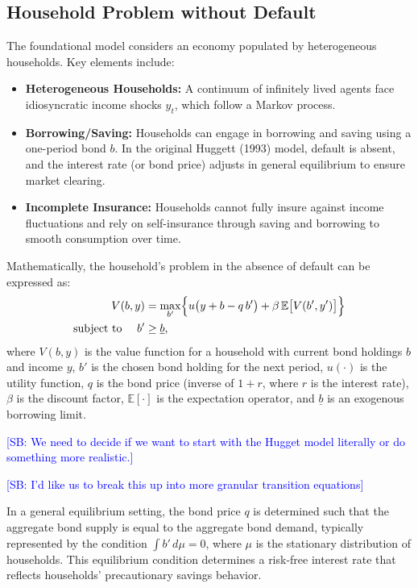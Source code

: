 \documentclass[acmsmall]{acmart}
\newcommand{\spb}[1]{\textcolor{blue}{[SB: #1]}}
\begin{document}
\subsection{Household Problem without Default}


The foundational \citep{Huggett1993} model considers an economy populated by heterogeneous households. Key elements include:

\begin{itemize}
    \item \textbf{Heterogeneous Households:} A continuum of infinitely lived agents face idiosyncratic income shocks $y_t$, which follow a Markov process.
    \item \textbf{Borrowing/Saving:} Households can engage in borrowing and saving using a one-period bond $b$. In the original Huggett (1993) model, default is absent, and the interest rate (or bond price) adjusts in general equilibrium to ensure market clearing.
    \item \textbf{Incomplete Insurance:} Households cannot fully insure against income fluctuations and rely on self-insurance through saving and borrowing to smooth consumption over time.
\end{itemize}

Mathematically, the household's problem in the absence of default can be expressed as:
\begin{equation}
\begin{aligned}
V(b, y) &= \max_{b'} \Bigl\{ u\bigl(y + b - q\,b'\bigr) + \beta \,\mathbb{E}\bigl[V(b', y')\bigr] \Bigr\} \\
\text{subject to } \quad b' &\ge \underline{b},
\end{aligned}
\end{equation}
where $V(b, y)$ is the value function for a household with current bond holdings $b$ and income $y$, $b'$ is the chosen bond holding for the next period, $u(\cdot)$ is the utility function, $q$ is the bond price (inverse of $1+r$, where $r$ is the interest rate), $\beta$ is the discount factor, $\mathbb{E}[\cdot]$ is the expectation operator, and $\underline{b}$ is an exogenous borrowing limit.

\spb{We need to decide if we want to start with the Hugget model literally or do something more realistic.}

\spb{I'd like us to break this up into more granular transition equations}

In a general equilibrium setting, the bond price $q$ is determined such that the aggregate bond supply is equal to the aggregate bond demand, typically represented by the condition $\int b' \, d\mu = 0$, where $\mu$ is the stationary distribution of households. This equilibrium condition determines a risk-free interest rate that reflects households' precautionary savings behavior.
\end{document}
